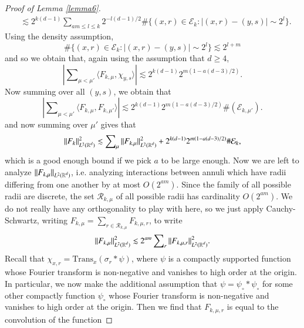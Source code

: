 \begin{proof}[Proof of Lemma \ref{lemma6}]
\begin{equation}
\begin{split}
        &\lesssim 2^{k(d-1)} \sum\nolimits_{am \leq l \leq k} 2^{-l(d-1)/2} \# \{ (x,r) \in \mathcal{E}_k: |(x,r) - (y,s)| \sim 2^l \}.
    \end{split}
    \end{equation}
    Using the density assumption,
    \begin{equation}
      \# \{ (x,r) \in \mathcal{E}_k: |(x,r) - (y,s)| \sim 2^l \} \lesssim 2^{l + m}
    \end{equation}
    and so we obtain that, again using the assumption that $d \geq 4$,
    \begin{equation}
      |\sum\nolimits_{\mu < \mu'} \langle F_{k,\mu}, \chi_{y,s} \rangle| \lesssim 2^{k(d-1)} 2^{m(1-a(d-3)/2)}.
    \end{equation}
    Now summing over all $(y,s)$, we obtain that
    \begin{equation}
      \left| \sum\nolimits_{\mu < \mu'} \langle F_{k,\mu}, F_{k,\mu'} \rangle \right| \lesssim 2^{k(d-1)} 2^{m(1 - a(d-3)/2)} \#(\mathcal{E}_{k,\mu'}).
    \end{equation}
    and now summing over $\mu'$ gives that
    \begin{equation}
      \| F_k \|_{L^2(\operatorname{\mathbb{R}}^d)}^2 \lesssim \sum\nolimits_\mu \| F_{k,\mu} \|_{L^2(\operatorname{\mathbb{R}}^d)}^2 + 2^{k(d-1)} 2^{m(1 - a(d-3)/2)} \# \mathcal{E}_k,
    \end{equation}
    which is a good enough bound if we pick $a$ to be large enough. Now we are left to analyze $\| F_{k,\mu} \|_{L^2(\operatorname{\mathbb{R}}^d)}$, i.e. analyzing interactions between annuli which have radii differing from one another by at most $O(2^{am})$. Since the family of all possible radii are discrete, the set $\mathcal{R}_{k,\mu}$ of all possible radii has cardinality $O(2^{am})$. We do not really have any orthogonality to play with here, so we just apply Cauchy-Schwartz, writing $F_{k,\mu} = \sum\nolimits_{r \in \mathcal{R}_{k,\mu}} F_{k,\mu,r}$, to write
    \begin{equation}
      \| F_{k,\mu} \|_{L^2(\operatorname{\mathbb{R}}^d)}^2 \lesssim 2^{am} \sum\nolimits_r \| F_{k,\mu,r} \|_{L^2(\operatorname{\mathbb{R}}^d)}^2.
    \end{equation}
    Recall that $\chi_{x,r} = \text{Trans}_x(\sigma_r * \psi)$, where $\psi$ is a compactly supported function whose Fourier transform is non-negative and vanishes to high order at the origin. In particular, we now make the additional assumption that $\psi = \psi_{\circ} * \psi_{\circ}$ for some other compactly function $\psi_{\circ}$ whose Fourier transform is non-negative and vanishes to high order at the origin. Then we find that $F_{k,\mu,r}$ is equal to the convolution of the function

\end{proof}
